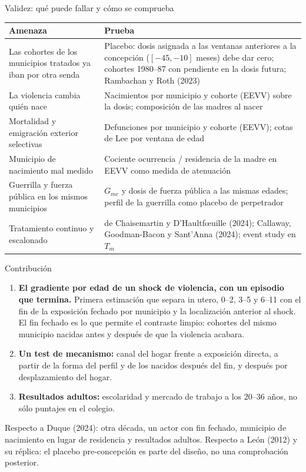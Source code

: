 \documentclass[aspectratio=169,10pt]{beamer}
\begin{document}
\begin{frame}{Validez: qué puede fallar y cómo se comprueba}
\small
\renewcommand{\arraystretch}{1.2}
\begin{tabular}{@{}p{5.0cm}p{8.6cm}@{}}
\toprule
\textbf{Amenaza} & \textbf{Prueba} \\
\midrule
Las cohortes de los municipios tratados ya iban por otra senda & Placebo: dosis asignada a las ventanas anteriores a la concepción ($[-45,-10]$ meses) debe dar cero; cohortes 1980--87 con pendiente en la dosis futura; Rambachan y Roth (2023) \\
La violencia cambia quién nace & Nacimientos por municipio y cohorte (EEVV) sobre la dosis; composición de las madres al nacer \\
Mortalidad y emigración exterior selectivas & Defunciones por municipio y cohorte (EEVV); cotas de Lee por ventana de edad \\
Municipio de nacimiento mal medido & Cociente ocurrencia / residencia de la madre en EEVV como medida de atenuación \\
Guerrilla y fuerza pública en los mismos municipios & $G_{mc}$ y dosis de fuerza pública a las mismas edades; perfil de la guerrilla como placebo de perpetrador \\
Tratamiento continuo y escalonado & de Chaisemartin y D'Haultf\oe uille (2024); Callaway, Goodman-Bacon y Sant'Anna (2024); event study en $T_m$ \\
\bottomrule
\end{tabular}
\end{frame}

\begin{frame}{Contribución}
\begin{enumerate}
\item \textbf{El gradiente por edad de un shock de violencia, con un episodio que termina.} Primera estimación que separa in utero, 0--2, 3--5 y 6--11 con el fin de la exposición fechado por municipio y la localización anterior al shock. El fin fechado es lo que permite el contraste limpio: cohortes del mismo municipio nacidas antes y después de que la violencia acabara.
\item \textbf{Un test de mecanismo:} canal del hogar frente a exposición directa, a partir de la forma del perfil y de los nacidos después del fin, y después por desplazamiento del hogar.
\item \textbf{Resultados adultos:} escolaridad y mercado de trabajo a los 20--36 años, no sólo puntajes en el colegio.
\end{enumerate}
\vspace{0.6em}
\small
Respecto a Duque (2024): otra década, un actor con fin fechado, municipio de nacimiento en lugar de residencia y resultados adultos. Respecto a León (2012) y su réplica: el placebo pre-concepción es parte del diseño, no una comprobación posterior.
\end{frame}
\end{document}
